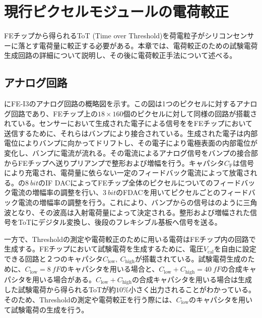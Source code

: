 \chapter{現行ピクセルモジュールの電荷較正}
\label{sec:chap3}

FEチップから得られるToT (Time over Threshold)を荷電粒子がシリコンセンサーに落とす電荷量に較正する必要がある。本章では、電荷較正のための試験電荷生成回路の詳細について説明し、その後に電荷較正手法について述べる。

\section{アナログ回路}
\label{sec:analog}
にFE-I3のアナログ回路の概略図を示す。この図は1つのピクセルに対するアナログ回路であり、FEチップ上の$18\times160$個のピクセルに対して同様の回路が搭載されている。センサーにおいて生成された電子による信号ををFEチップにおいて送信するために、それらはバンプにより接合されている。生成された電子は内部電位によりバンプに向かってドリフトし、その電子により電極表面の内部電位が変化し、バンプに電流が流れる。その電流によるアナログ信号をバンプの接合部からFEチップへ送りプリアンプで整形および増幅を行う。キャパシタ$C_\mathrm{F}$は信号により充電され、電荷量に依らない一定のフィードバック電流によって放電される。の$8\ \si{bit}$のIF DACによってFEチップ全体のピクセルについてのフィードバック電流の増幅率の調整を行い、$3\ \si{bit}$のFDACを用いてピクセルごとのフィードバック電流の増幅率の調整を行う。これにより、バンプからの信号はのように三角波となり、その波高は入射電荷量によって決定される。整形および増幅された信号をToTにデジタル変換し、後段のフレキシブル基板へ信号を送る。

一方で、Thresholdの測定や電荷較正のために用いる電荷はFEチップ内の回路で生成する。FEチップにおいて試験電荷を生成するために、電圧$V_\mathrm{cal}$を自由に設定できる回路と２つのキャパシタ$C_\mathrm{low},\ C_\mathrm{high}$が搭載されている。試験電荷生成のために、$C_\mathrm{low}=8\ \si{fF}$のキャパシタを用いる場合と、$C_\mathrm{low}+C_\mathrm{high}=40\ \si{fF}$の合成キャパシタを用いる場合がある。$C_\mathrm{low}+C_\mathrm{high}$の合成キャパシタを用いる場合は生成した試験電荷から得られるToTが約$10\%$小さく出力されることがわかっている。そのため、Thresholdの測定や電荷較正を行う際には、$C_\mathrm{low}$のキャパシタを用いて試験電荷の生成を行う。


